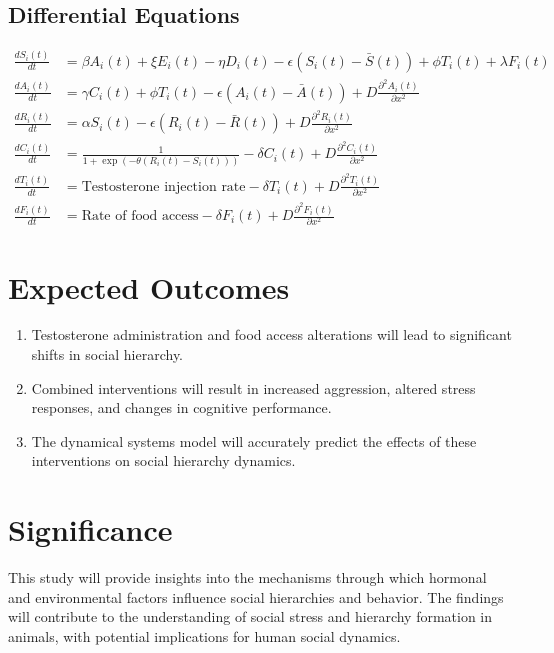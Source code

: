 \documentclass[english, a4paper, 11pt]{article}
\begin{document}
\subsection*{Differential Equations}
\begin{align*}
    \frac{dS_i(t)}{dt} & = \beta A_i(t) + \xi E_i(t) - \eta D_i(t) - \epsilon (S_i(t) - \bar{S}(t)) + \phi T_i(t) + \lambda F_i(t)  \\
    \frac{dA_i(t)}{dt} & = \gamma C_i(t) + \phi T_i(t) - \epsilon (A_i(t) - \bar{A}(t)) + D \frac{\partial^2 A_i(t)}{\partial x^2}  \\
    \frac{dR_i(t)}{dt} & = \alpha S_i(t) - \epsilon (R_i(t) - \bar{R}(t)) + D \frac{\partial^2 R_i(t)}{\partial x^2}                \\
    \frac{dC_i(t)}{dt} & = \frac{1}{1 + \exp(-\theta (R_i(t) - S_i(t)))} - \delta C_i(t) + D \frac{\partial^2 C_i(t)}{\partial x^2} \\
    \frac{dT_i(t)}{dt} & = \text{Testosterone injection rate} - \delta T_i(t) + D \frac{\partial^2 T_i(t)}{\partial x^2}            \\
    \frac{dF_i(t)}{dt} & = \text{Rate of food access} - \delta F_i(t) + D \frac{\partial^2 F_i(t)}{\partial x^2}
\end{align*}

\section*{Expected Outcomes}
\begin{enumerate}
    \item Testosterone administration and food access alterations will lead to significant shifts in social hierarchy.
    \item Combined interventions will result in increased aggression, altered stress responses, and changes in cognitive performance.
    \item The dynamical systems model will accurately predict the effects of these interventions on social hierarchy dynamics.
\end{enumerate}

\section*{Significance}
This study will provide insights into the mechanisms through which hormonal and environmental factors influence social hierarchies and behavior. The findings will contribute to the understanding of social stress and hierarchy formation in animals, with potential implications for human social dynamics.
\end{document}
